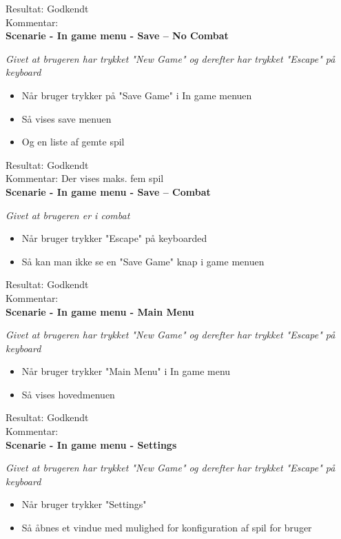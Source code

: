 Resultat: Godkendt\\
Kommentar:\\

\textbf{Scenarie - In game menu - Save -- No Combat}

\textit{Givet at brugeren har trykket "New Game" og derefter har trykket "Escape" på keyboard}

\begin{itemize}
  \item Når bruger trykker på "Save Game" i In game menuen
  \item Så vises save menuen
  \item Og en liste af gemte spil
\end{itemize}

Resultat: Godkendt\\
Kommentar: Der vises maks. fem spil\\

\textbf{Scenarie - In game menu - Save -- Combat}

\textit{Givet at brugeren er i combat}

\begin{itemize}
  \item Når bruger trykker "Escape" på keyboarded
  \item Så kan man ikke se en "Save Game" knap i game menuen
\end{itemize}

Resultat: Godkendt\\
Kommentar:\\

\textbf{Scenarie - In game menu - Main Menu}

\textit{Givet at brugeren har trykket "New Game" og derefter har trykket "Escape" på keyboard}

\begin{itemize}
  \item Når bruger trykker "Main Menu" i In game menu
  \item Så vises hovedmenuen
\end{itemize}

Resultat: Godkendt\\
Kommentar:\\

\textbf{Scenarie - In game menu - Settings}

\textit{Givet at brugeren har trykket "New Game" og derefter har trykket "Escape" på keyboard}

\begin{itemize}
  \item Når bruger trykker "Settings"
  \item Så åbnes et vindue med mulighed for konfiguration af spil for bruger
\end{itemize}

